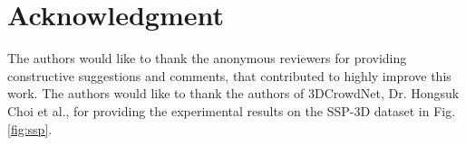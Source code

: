 \documentclass[journal]{IEEEtran}
\begin{document}
%














\section*{Acknowledgment}
 The authors would like to thank the anonymous reviewers for providing constructive suggestions and comments, that contributed to highly improve this work. The authors would like to thank the authors of 3DCrowdNet, Dr. Hongsuk Choi et al., for providing the experimental results on the SSP-3D dataset in Fig. \ref{fig:ssp}.
\end{document}
